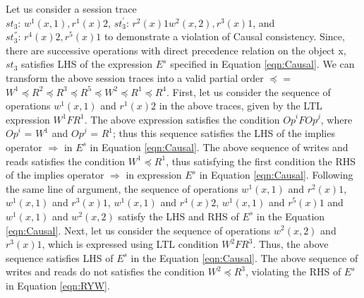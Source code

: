 \documentclass[journal,compsoc]{IEEEtran}
\begin{document}
 \par Let us consider a session trace \\ $\mathit{st}_3$: $w^1(x,1), r^1(x){2}$, $\mathit{st}_3^{'}$: $r^2(x){1} w^2(x,2), r^3(x){1}$, and \\ $\mathit{st}_3^{''}$: $r^4(x){2}, r^5(x){1}$ to demonstrate
 a violation of Causal consistency. Since, there are successive operations with direct precedence relation on the object x, $\mathit{st}_3$
 satisfies LHS of the expression $E^s$ specified in Equation \ref{eqn:Causal}.  We can transform
 the above session traces into a valid partial order $\preccurlyeq$ =
 $W^1 \preccurlyeq R^2 \preccurlyeq R^3 \preccurlyeq R^5 \preccurlyeq W^2 \preccurlyeq R^1 \preccurlyeq R^4$. First, let us consider the sequence of operations
 $w^1(x,1)$ and $r^1(x){2}$ in the above traces, given by the LTL expression $W^1 F R^1$. The above expression satisfies
 the condition $\mathit{Op}^i F \mathit{Op}^j$, where $\mathit{Op}^i$ = $W^1$ and $\mathit{Op}^j$ = $R^1$;
 thus this sequence satisfies the LHS of the implies operator $\Rightarrow$ in $E^s$ in Equation \ref{eqn:Causal}. The above sequence of
 writes and reads satisfies the condition $W^1 \preccurlyeq R^1$, thus satisfying the first condition the RHS of
 the implies operator $\Rightarrow$ in expression $E^s$ in Equation \ref{eqn:Causal}.
 Following the same line of argument, the sequence of operations
  $w^1(x,1)$ and $r^2(x){1}$, $w^1(x,1)$ and $r^3(x){1}$, $w^1(x,1)$ and $r^4(x){2}$, $w^1(x,1)$ and $r^5(x){1}$
  and $w^1(x,1)$ and  $w^2(x,2)$ satisfy the LHS and RHS of $E^s$ in the Equation \ref{eqn:Causal}. Next, let us consider
  the sequence of operations $w^2(x,2)$ and $r^3(x){1}$, which is expressed using LTL condition $W^2 F R^3$.
  Thus, the above sequence satisfies LHS of $E^s$ in the Equation \ref{eqn:Causal}. The above sequence of
 writes and reads do not satisfies the condition $W^2 \preccurlyeq R^3$, violating the RHS of $E^s$ in Equation \ref{eqn:RYW}.
\end{document}
